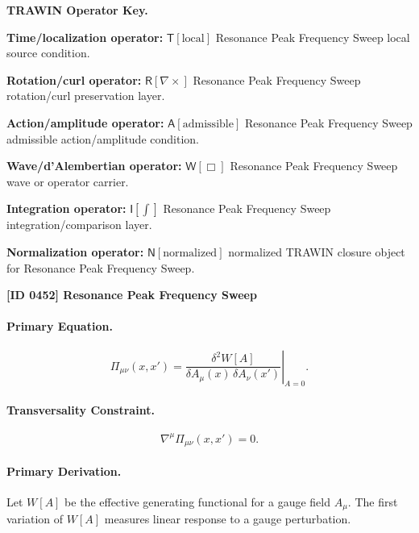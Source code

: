 \par\vspace{0.45\baselineskip}
\noindent\begin{minipage}[t]{\linewidth}
\begingroup
\small
\raggedright
\textbf{TRAWIN Operator Key.}\par
\noindent\textbf{Time/localization operator:} $\mathsf{T}\!\left[\mathrm{local}\right]$ Resonance Peak Frequency Sweep local source condition.\par
\noindent\textbf{Rotation/curl operator:} $\mathsf{R}\!\left[\nabla\times\right]$ Resonance Peak Frequency Sweep rotation/curl preservation layer.\par
\noindent\textbf{Action/amplitude operator:} $\mathsf{A}\!\left[\mathrm{admissible}\right]$ Resonance Peak Frequency Sweep admissible action/amplitude condition.\par
\noindent\textbf{Wave/d'Alembertian operator:} $\mathsf{W}\!\left[\Box\right]$ Resonance Peak Frequency Sweep wave or operator carrier.\par
\noindent\textbf{Integration operator:} $\mathsf{I}\!\left[\int\right]$ Resonance Peak Frequency Sweep integration/comparison layer.\par
\noindent\textbf{Normalization operator:} $\mathsf{N}\!\left[\mathrm{normalized}\right]$ normalized TRAWIN closure object for Resonance Peak Frequency Sweep.\par
\endgroup
\end{minipage}

\clearpage
\noindent\textbf{[ID 0452] Resonance Peak Frequency Sweep}\par
\vspace{0.35em}
\paragraph{Primary Equation.}
\begin{equation}
\Pi_{\mu\nu}(x,x')
=
\left.
\frac{\delta^2 W[A]}
{\delta A_\mu(x)\,\delta A_\nu(x')}
\right|_{A=0}.
\end{equation}

\paragraph{Transversality Constraint.}
\begin{equation}
\nabla^\mu \Pi_{\mu\nu}(x,x')=0 .
\end{equation}

\paragraph{Primary Derivation.}
Let $W[A]$ be the effective generating functional for a gauge field $A_\mu$.  
The first variation of $W[A]$ measures linear response to a gauge perturbation.

